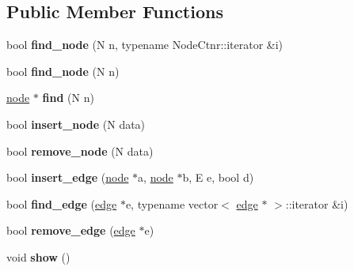\subsection*{\-Public \-Member \-Functions}
\begin{DoxyCompactItemize}
\item 
\hypertarget{classGraph_a5d6e57ef94339485e0850eb7f4b0c985}{bool {\bfseries find\-\_\-node} (\-N n, typename \-Node\-Ctnr\-::iterator \&i)}\label{classGraph_a5d6e57ef94339485e0850eb7f4b0c985}

\item 
\hypertarget{classGraph_a467cf339802c8f81acaced754ebe604c}{bool {\bfseries find\-\_\-node} (\-N n)}\label{classGraph_a467cf339802c8f81acaced754ebe604c}

\item 
\hypertarget{classGraph_a7d089cc40b12b70076e294e02718d9cb}{\hyperlink{classNode}{node} $\ast$ {\bfseries find} (\-N n)}\label{classGraph_a7d089cc40b12b70076e294e02718d9cb}

\item 
\hypertarget{classGraph_aad79298e0058ca369f9571a2a6e72c8a}{bool {\bfseries insert\-\_\-node} (\-N data)}\label{classGraph_aad79298e0058ca369f9571a2a6e72c8a}

\item 
\hypertarget{classGraph_aaf9ab51e93b9c473cc76b7f33177972f}{bool {\bfseries remove\-\_\-node} (\-N data)}\label{classGraph_aaf9ab51e93b9c473cc76b7f33177972f}

\item 
\hypertarget{classGraph_a4960e65deb36aa5b8cf8f47f87e75b9a}{bool {\bfseries insert\-\_\-edge} (\hyperlink{classNode}{node} $\ast$a, \hyperlink{classNode}{node} $\ast$b, \-E e, bool d)}\label{classGraph_a4960e65deb36aa5b8cf8f47f87e75b9a}

\item 
\hypertarget{classGraph_afe8b919dbacc077b2460735d180e90bb}{bool {\bfseries find\-\_\-edge} (\hyperlink{classEdge}{edge} $\ast$e, typename vector$<$ \hyperlink{classEdge}{edge} $\ast$ $>$\-::iterator \&i)}\label{classGraph_afe8b919dbacc077b2460735d180e90bb}

\item 
\hypertarget{classGraph_ae361bbffc3fe0c6d915f65172c665005}{bool {\bfseries remove\-\_\-edge} (\hyperlink{classEdge}{edge} $\ast$e)}\label{classGraph_ae361bbffc3fe0c6d915f65172c665005}

\item 
\hypertarget{classGraph_a8a2b44dce8fedccd75a49e57bed8466e}{void {\bfseries show} ()}\label{classGraph_a8a2b44dce8fedccd75a49e57bed8466e}

\end{DoxyCompactItemize}
